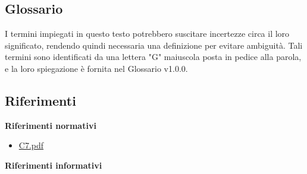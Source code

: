 \documentclass{article}
\begin{document}
\subsection{Glossario}
I termini impiegati in questo testo potrebbero suscitare incertezze circa il loro significato, rendendo quindi necessaria una definizione per evitare ambiguità. Tali termini sono identificati da una lettera "G" maiuscola posta in pedice alla parola, e la loro spiegazione è fornita nel Glossario v1.0.0.

\subsection{Riferimenti}
\textbf{Riferimenti normativi}
\begin{itemize}
    \item \href{https://www.math.unipd.it/~tullio/IS-1/2023/Progetto/C7.pdf}{C7.pdf}
\end{itemize}
\textbf{Riferimenti informativi}
\end{document}
